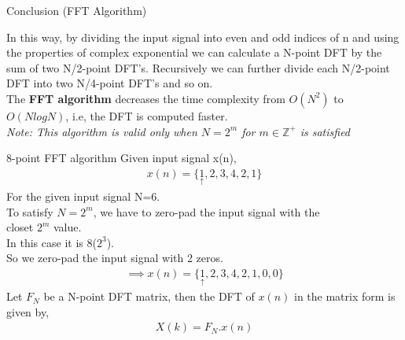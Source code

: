 \documentclass{beamer}
\begin{document}

\begin{frame}{Conclusion (FFT Algorithm)}

In this way, by dividing the input signal into even and odd indices of n and using the properties of complex exponential we can calculate a N-point DFT by the sum of two N/2-point DFT's. Recursively we can further divide each N/2-point DFT into two N/4-point DFT's and so on. \\
\bigskip
The {\bf{FFT algorithm}} decreases the time complexity from $O(N^{2})$ to $O(NlogN)$, i.e, the DFT is computed faster. \\
\bigskip
\emph{Note: This algorithm is valid only when $N = 2^{m}$ for $m \in \mathbb{Z^{+}}$ is satisfied}

\end{frame}
\begin{frame}{8-point FFT algorithm}
Given input signal x(n),
\begin{align}
    x(n) = \{{\underset{\uparrow}{1},2,3,4,2,1} \}
\end{align}
For the given input signal N=6.\\
To satisfy $N = 2^{m}$, we have to zero-pad the input signal with the \\ closet $2^m$ value.\\
In this case it is 8($2^3$). \\
So we zero-pad the input signal with 2 zeros.
\begin{align}
    \implies x(n) = \{{\underset{\uparrow}{1},2,3,4,2,1,0,0}\}
\end{align}
Let $F_N$ be a N-point DFT matrix, then the DFT of $x(n)$ in the matrix form is given by,
\begin{align}
    X(k) = {F_{N}}.x(n)
\end{align}

\end{frame}
\end{document}
